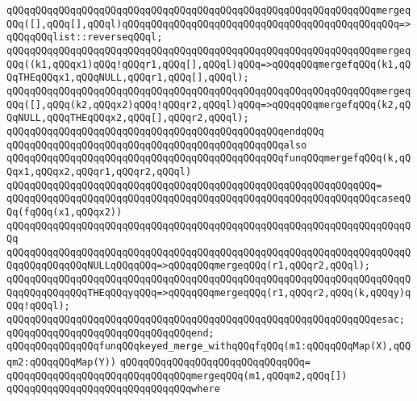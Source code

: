 \verb|qQQqqQQqqQQqqQQqqQQqqQQqqQQqqQQqqQQqqQQqqQQqqQQqqQQqqQQqqQQqqQQqmergeqQQq([],qQQq[],qQQql)qQQqqQQqqQQqqQQqqQQqqQQqqQQqqQQqqQQqqQQqqQQqqQQq=>qQQqqQQqlist::reverseqQQql;|\newline
\verb|qQQqqQQqqQQqqQQqqQQqqQQqqQQqqQQqqQQqqQQqqQQqqQQqqQQqqQQqqQQqqQQqmergeqQQq((k1,qQQqx1)qQQq!qQQqr1,qQQq[],qQQql)qQQq=>qQQqqQQqmergefqQQq(k1,qQQqTHEqQQqx1,qQQqNULL,qQQqr1,qQQq[],qQQql);|\newline
\verb|qQQqqQQqqQQqqQQqqQQqqQQqqQQqqQQqqQQqqQQqqQQqqQQqqQQqqQQqqQQqqQQqmergeqQQq([],qQQq(k2,qQQqx2)qQQq!qQQqr2,qQQql)qQQq=>qQQqqQQqmergefqQQq(k2,qQQqNULL,qQQqTHEqQQqx2,qQQq[],qQQqr2,qQQql);|\newline
\verb|qQQqqQQqqQQqqQQqqQQqqQQqqQQqqQQqqQQqqQQqqQQqqQQqendqQQq|\newline
\newline
\verb|qQQqqQQqqQQqqQQqqQQqqQQqqQQqqQQqqQQqqQQqqQQqqQQqalso|\newline
\verb|qQQqqQQqqQQqqQQqqQQqqQQqqQQqqQQqqQQqqQQqqQQqqQQqfunqQQqmergefqQQq(k,qQQqx1,qQQqx2,qQQqr1,qQQqr2,qQQql)|\newline
\verb|qQQqqQQqqQQqqQQqqQQqqQQqqQQqqQQqqQQqqQQqqQQqqQQqqQQqqQQqqQQqqQQq=|\newline
\verb|qQQqqQQqqQQqqQQqqQQqqQQqqQQqqQQqqQQqqQQqqQQqqQQqqQQqqQQqqQQqqQQqcaseqQQq(fqQQq(x1,qQQqx2))|\newline
\verb|qQQqqQQqqQQqqQQqqQQqqQQqqQQqqQQqqQQqqQQqqQQqqQQqqQQqqQQqqQQqqQQqqQQqqQQq|\newline
\verb|qQQqqQQqqQQqqQQqqQQqqQQqqQQqqQQqqQQqqQQqqQQqqQQqqQQqqQQqqQQqqQQqqQQqqQQqqQQqqQQqqQQqNULLqQQqqQQq=>qQQqqQQqmergeqQQq(r1,qQQqr2,qQQql);|\newline
\verb|qQQqqQQqqQQqqQQqqQQqqQQqqQQqqQQqqQQqqQQqqQQqqQQqqQQqqQQqqQQqqQQqqQQqqQQqqQQqqQQqqQQqTHEqQQqyqQQq=>qQQqqQQqmergeqQQq(r1,qQQqr2,qQQq(k,qQQqy)qQQq!qQQql);|\newline
\verb|qQQqqQQqqQQqqQQqqQQqqQQqqQQqqQQqqQQqqQQqqQQqqQQqqQQqqQQqqQQqqQQqesac;|\newline
\verb|qQQqqQQqqQQqqQQqqQQqqQQqqQQqqQQqend;|\newline
\newline
\verb|qQQqqQQqqQQqqQQqfunqQQqkeyed_merge_withqQQqfqQQq(m1:qQQqqQQqMap(X),qQQqm2:qQQqqQQqMap(Y))|\newline
\verb|qQQqqQQqqQQqqQQqqQQqqQQqqQQqqQQq=|\newline
\verb|qQQqqQQqqQQqqQQqqQQqqQQqqQQqqQQqmergeqQQq(m1,qQQqm2,qQQq[])|\newline
\verb|qQQqqQQqqQQqqQQqqQQqqQQqqQQqqQQqwhere|\newline
